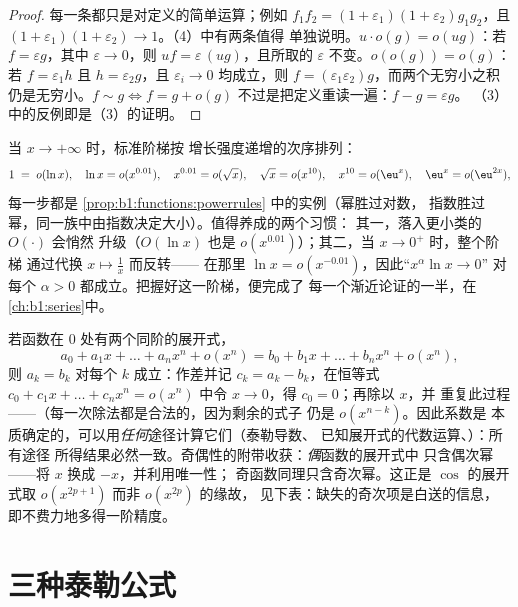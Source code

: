 \begin{proof}
每一条都只是对定义的简单运算；例如
$f_1 f_2 = (1+\varepsilon_1)(1+\varepsilon_2) g_1 g_2$，且 $(1 +
\varepsilon_1)(1+\varepsilon_2) \to 1$。（4）中有两条值得
单独说明。$u\cdot o(g) = o(ug)$：若 $f = \varepsilon g$，其中
$\varepsilon \to 0$，则 $uf = \varepsilon\,(ug)$，且所取的
$\varepsilon$ 不变。$o(o(g)) = o(g)$：若 $f = \varepsilon_1 h$ 且
$h = \varepsilon_2 g$，且 $\varepsilon_i \to 0$ 均成立，则 $f =
(\varepsilon_1\varepsilon_2) g$，而两个无穷小之积
仍是无穷小。$f \sim g \iff f = g +
o(g)$ 不过是把定义重读一遍：$f - g = \varepsilon g$。
（3）中的反例即是（3）的证明。
\end{proof}

\begin{example}[比较阶梯]\label{ex:b1:taylor:scale}
当 $x \to +\infty$ 时，标准阶梯按
增长强度递增的次序排列：
\[
1 \;=\; o(\ln x), \quad
\ln x = o(x^{0.01}), \quad
x^{0.01} = o(\sqrt x), \quad
\sqrt x = o(x^{10}), \quad
x^{10} = o(\eu^{x}), \quad
\eu^x = o(\eu^{2x}) ,
\]
每一步都是
\cref{prop:b1:functions:powerrules} 中的实例（幂胜过对数，
指数胜过幂，同一族中由指数决定大小）。值得养成的两个习惯：
其一，落入更小类的 $O(\cdot)$ 会悄然
升级（$O(\ln x)$ 也是
$o(x^{0.01})$）；其二，当 $x \to 0^+$ 时，整个阶梯
通过代换 $x \mapsto \frac1x$ 而反转——
在那里 $\ln x = o(x^{-0.01})$，因此“$x^\alpha \ln x \to 0$”
对每个 $\alpha > 0$ 都成立。把握好这一阶梯，便完成了
每一个渐近论证的一半，在
\cref{ch:b1:series}中。
\end{example}

\begin{example}[展开式的唯一性与奇偶性的附带收获]\label{ex:b1:taylor:uniqueness}
若函数在 $0$ 处有两个同阶的展开式，
\[
a_0 + a_1 x + \dots + a_n x^n + o(x^n)
= b_0 + b_1 x + \dots + b_n x^n + o(x^n),
\]
则 $a_k = b_k$ 对每个 $k$ 成立：作差并记 $c_k =
a_k - b_k$，在恒等式 $c_0 + c_1 x + \dots + c_n x^n
= o(x^n)$ 中令 $x \to 0$，得 $c_0 = 0$；再除以 $x$，并
重复此过程——（每一次除法都是合法的，因为剩余的式子
仍是 $o(x^{n-k})$。因此系数是
本质确定的，可以用\emph{任何}途径计算它们（泰勒导数、
已知展开式的代数运算、）：所有途径
所得结果必然一致。奇偶性的附带收获：\emph{偶}函数的展开式中
只含偶次幂——将 $x$ 换成 $-x$，并利用唯一性；
奇函数同理只含奇次幂。这正是
$\cos$ 的展开式取 $o(x^{2p+1})$ 而非 $o(x^{2p})$ 的缘故，
见下表：缺失的奇次项是白送的信息，
即不费力地多得一阶精度。
\end{example}

\section{三种泰勒公式}

